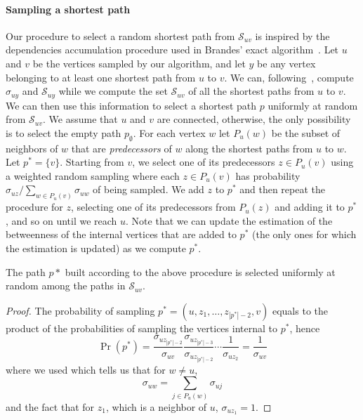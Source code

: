 \paragraph{Sampling a shortest path}
Our procedure to select a random shortest path from $\mathcal{S}_{uv}$ is
inspired by the dependencies accumulation procedure used in Brandes' exact
algorithm~\citep{Brandes01}. 
Let $u$ and $v$ be the vertices sampled by our algorithm, and let $y$ be any
vertex belonging to at least one shortest path from $u$ to $v$. We can,
following~\citet{Brandes01}, compute $\sigma_{uy}$ and $\mathcal{S}_{uy}$ while
we compute the set $\mathcal{S}_{uv}$  of all the shortest paths from $u$ to $v$. We
can then use this information to select a shortest path $p$ uniformly at random from
$\mathcal{S}_{uv}$. We assume that $u$ and $v$ are connected, otherwise, the
only possibility is to select the empty path $p_\emptyset$. For each vertex $w$
let $P_u(w)$ be the subset of neighbors of $w$ that are \emph{predecessors} of
$w$ along the shortest paths from $u$ to $w$. Let $p^*=\{v\}$. Starting from $v$,
we select one of its predecessors $z\in P_u(v)$ using a weighted random sampling
where each $z\in P_u(v)$ has probability $\sigma_{uz}/\sum_{w\in
P_u(v)}\sigma_{uw}$ of being sampled. We add $z$ to $p^*$ and  then repeat the
procedure for $z$, selecting one of its predecessors from $P_u(z)$ and adding it
to $p^*$, and so on until we reach $u$. Note that we can update the estimation
of the betweenness of the internal vertices that are added to $p^*$ (the only
ones for which the estimation is updated) as we compute $p^*$.

\begin{lemma}\label{lem:samplpath}
  The path $p*$ built according to the above procedure is selected uniformly at
  random among the paths in $\mathcal{S}_{uv}$.
\end{lemma}

\begin{proof}
  The probability of sampling $p^*=(u,z_1,\dotsc,z_{|p^*|-2},v)$ equals to the
  product of the probabilities of sampling the vertices internal to $p^*$, hence
  \[
  \Pr(p^*)=\frac{\sigma_{uz_{|p^*|-2}}}{\sigma_{uv}}\frac{\sigma_{uz_{|p^*|-3}}}{\sigma_{uz_{|p^*|-2}}}\dotsb
  \frac{1}{\sigma_{uz_2}}=\frac{1}{\sigma_{uv}}
  \]
  where we used \citep[Lemma3]{Brandes01} which tells us that for $w\neq u$,
  \[
  \sigma_{uw}=\sum_{j\in P_u(w)}\sigma_{uj}
  \]
  and the fact that for $z_1$, which is a neighbor of $u$, $\sigma_{uz_1}=1$.
\end{proof}

